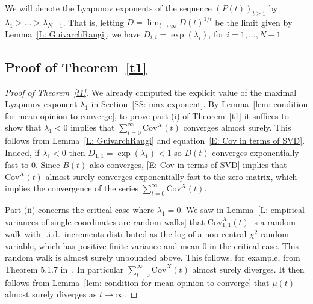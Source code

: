\documentclass[12pt]{article}
\newcommand{\Cov}{\mathrm{Cov}}
\newcommand{\1}{\mathbf{1}}
\begin{document}
We will denote the Lyapunov exponents of the sequence $\left(P(t)\right)_{t \ge 1}$ by $\lambda_1 > \dots > \lambda_{N-1}$.  That is, letting $D  = \lim_{t \to \infty} D(t)^{1/t}$ be the limit given by Lemma~\ref{L: GuivarchRaugi}, we have $D_{i,i} = \exp(\lambda_i)$, for $i = 1, \dots, N-1$.  

\subsection{Proof of Theorem~\ref{t1}}
\begin{proof}[Proof of Theorem~\ref{t1}]
We already computed the explicit value of the maximal Lyapunov exponent $\lambda_1$ in Section~\ref{SS: max exponent}. By Lemma~\ref{lem: condition for mean opinion to converge}, to prove part (i) of Theorem~\ref{t1} it suffices to show that $\lambda_1 < 0$ implies that $\sum_{t=0}^\infty \Cov^X(t)$ converges almost surely. This follows from Lemma~\ref{L: GuivarchRaugi} and equation~\eqref{E: Cov in terms of SVD}. Indeed, if $\lambda_1 < 0$ then $D_{1,1} = \exp(\lambda_1) < 1$ so $D(t)$ converges exponentially fast to $0$. Since $B(t)$ also converges, \eqref{E: Cov in terms of SVD} implies that $\Cov^X(t)$ almost surely converges exponentially fast to the zero matrix, which implies the convergence of the series $\sum_{t=0}^\infty \Cov^X(t)$.

Part (ii) concerns the critical case where  $\lambda_1 = 0$. We saw in Lemma~\ref{L: empirical variances of single coordinates are random walks} that $\Cov^X_{1,1}(t)$ is a random walk with i.i.d.~increments distributed as the log of a non-central $\chi^2$ random variable, which has positive finite variance and mean $0$ in the critical case. This random walk is almost surely unbounded above. This follows, for example, from Theorem 5.1.7 in~\cite{DL}. In particular $\sum_{t=0}^\infty \Cov^X(t)$ almost surely diverges. It then follows from Lemma~\ref{lem: condition for mean opinion to converge} that $\mu(t)$ almost surely diverges as $t \to \infty$. 


\end{proof}
\end{document}
